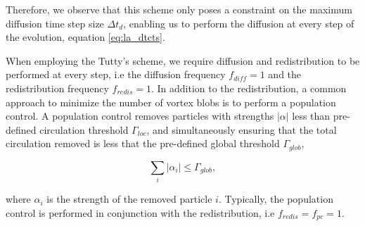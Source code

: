 Therefore, we observe that this scheme only poses a constraint on the maximum diffusion time step size $\Delta t_d$, enabling us to perform the diffusion at every step of the evolution, equation \ref{eq:la_dtcts}.

When employing the Tutty's scheme, we require diffusion and redistribution to be performed at every step, i.e the diffusion frequency $f_{diff}=1$ and the redistribution frequency $f_{redis}=1$. In addition to the redistribution, a common approach to minimize the number of vortex blobs is to perform a population control. A population control removes particles with strengths $\left|\alpha\right|$ less than pre-defined circulation threshold $\Gamma_{loc}$, and simultaneously ensuring that the total circulation removed is less that the pre-defined global threshold $\Gamma_{glob}$,

\begin{equation}
\sum_i \left|\alpha_i\right| \leqslant \Gamma_{glob},
\end{equation}

where $\alpha_i$ is the strength of the removed particle $i$. Typically, the population control is performed in conjunction with the redistribution, i.e $f_{redis}=f_{pc}=1$.




		
%
	
